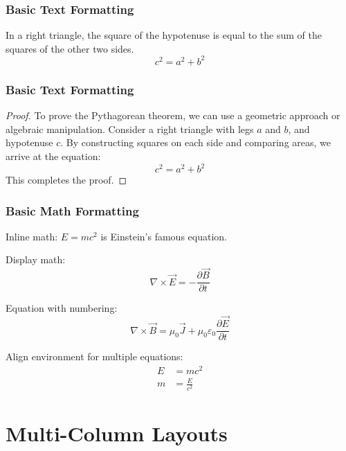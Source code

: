 \documentclass[aspectratio=169,professionalfonts]{beamer}
\begin{document}
\begin{frame}
    \frametitle{Basic Text Formatting}
    
    \begin{theorem}
        In a right triangle, the square of the hypotenuse is equal to the sum of the squares of the other two sides.
        \begin{equation}
            c^2 = a^2 + b^2
        \end{equation}
    \end{theorem}
\end{frame}

\begin{frame}
    \frametitle{Basic Text Formatting}
    
    \begin{proof}
        To prove the Pythagorean theorem, we can use a geometric approach or algebraic manipulation. 
        Consider a right triangle with legs \(a\) and \(b\), and hypotenuse \(c\). By constructing squares on each side and comparing areas, we arrive at the equation:
        \[
        c^2 = a^2 + b^2
        \]
        This completes the proof.
    \end{proof}
\end{frame}


\begin{frame}
    \frametitle{Basic Math Formatting}
    
    Inline math: $E = mc^2$ is Einstein's famous equation.
    
    Display math:
    \[
    \nabla \times \vec{E} = -\frac{\partial \vec{B}}{\partial t}
    \]
    
    Equation with numbering:
    \begin{equation}
        \nabla \times \vec{B} = \mu_0 \vec{J} + \mu_0 \varepsilon_0 \frac{\partial \vec{E}}{\partial t}
    \end{equation}
    
    Align environment for multiple equations:
    \begin{align}
        E &= mc^2 \\
        m &= \frac{E}{c^2}
    \end{align}
\end{frame}

\section{Multi-Column Layouts}
\end{document}

